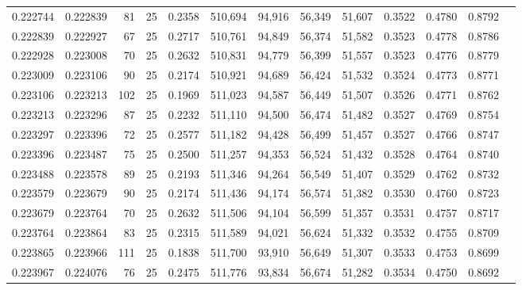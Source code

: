 \begin{tabular}{rrrrrrrrrrrrr}
0.222744 & 0.222839 &    81 &  25 &                                     0.2358 & 510,694 &  94,916 &  56,349 &  51,607 & 0.3522 & 0.4780 & 0.8792 \\
0.222839 & 0.222927 &    67 &  25 &                                     0.2717 & 510,761 &  94,849 &  56,374 &  51,582 & 0.3523 & 0.4778 & 0.8786 \\
0.222928 & 0.223008 &    70 &  25 &                                     0.2632 & 510,831 &  94,779 &  56,399 &  51,557 & 0.3523 & 0.4776 & 0.8779 \\
0.223009 & 0.223106 &    90 &  25 &                                     0.2174 & 510,921 &  94,689 &  56,424 &  51,532 & 0.3524 & 0.4773 & 0.8771 \\
0.223106 & 0.223213 &   102 &  25 &                                     0.1969 & 511,023 &  94,587 &  56,449 &  51,507 & 0.3526 & 0.4771 & 0.8762 \\
0.223213 & 0.223296 &    87 &  25 &                                     0.2232 & 511,110 &  94,500 &  56,474 &  51,482 & 0.3527 & 0.4769 & 0.8754 \\
0.223297 & 0.223396 &    72 &  25 &                                     0.2577 & 511,182 &  94,428 &  56,499 &  51,457 & 0.3527 & 0.4766 & 0.8747 \\
0.223396 & 0.223487 &    75 &  25 &                                     0.2500 & 511,257 &  94,353 &  56,524 &  51,432 & 0.3528 & 0.4764 & 0.8740 \\
0.223488 & 0.223578 &    89 &  25 &                                     0.2193 & 511,346 &  94,264 &  56,549 &  51,407 & 0.3529 & 0.4762 & 0.8732 \\
0.223579 & 0.223679 &    90 &  25 &                                     0.2174 & 511,436 &  94,174 &  56,574 &  51,382 & 0.3530 & 0.4760 & 0.8723 \\
0.223679 & 0.223764 &    70 &  25 &                                     0.2632 & 511,506 &  94,104 &  56,599 &  51,357 & 0.3531 & 0.4757 & 0.8717 \\
0.223764 & 0.223864 &    83 &  25 &                                     0.2315 & 511,589 &  94,021 &  56,624 &  51,332 & 0.3532 & 0.4755 & 0.8709 \\
0.223865 & 0.223966 &   111 &  25 &                                     0.1838 & 511,700 &  93,910 &  56,649 &  51,307 & 0.3533 & 0.4753 & 0.8699 \\
0.223967 & 0.224076 &    76 &  25 &                                     0.2475 & 511,776 &  93,834 &  56,674 &  51,282 & 0.3534 & 0.4750 & 0.8692 \\

\end{tabular}
